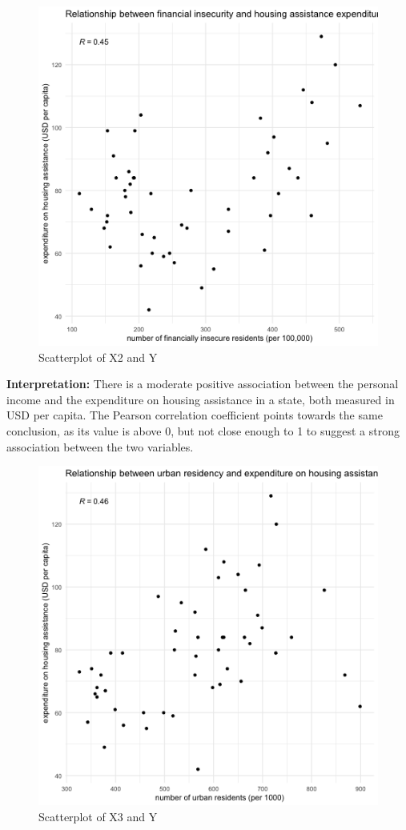 \documentclass[12pt,letterpaper]{article}
\begin{document}
\begin{figure}[h!]\centering
	\caption{\footnotesize Scatterplot of X2 and Y}
	\label{fig:plot_2}
	\includegraphics[width=.95\textwidth]{scatter_x2_y.png}
\end{figure}
\textbf{Interpretation:} There is a moderate positive association between the personal income and the expenditure on housing assistance in a state, both measured in USD per capita. The Pearson correlation coefficient points towards the same conclusion, as its value is above 0, but not close enough to 1 to suggest a strong association between the two variables. 
\newpage
\begin{figure}[h!]\centering
	\caption{\footnotesize Scatterplot of X3 and Y}
	\label{fig:plot_3}
	\includegraphics[width=.95\textwidth]{scatter_x3_y.png}
\end{figure}
\end{document}
